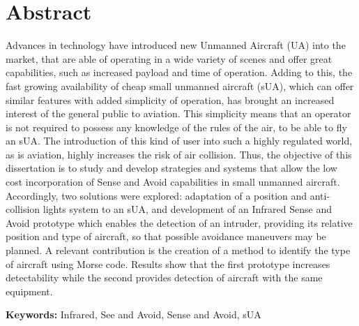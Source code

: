 
\section*{Abstract}


Advances in technology have introduced new Unmanned Aircraft (UA) into the market, that are able of operating in a wide variety of scenes and offer great capabilities, such as increased payload and time of operation. Adding to this, the fast growing availability of cheap small unmanned aircraft (sUA), which can offer similar features with added simplicity of operation, has brought an increased interest of the general public to aviation. This simplicity means that an operator is not required to possess any knowledge of the rules of the air, to be able to fly an sUA. The introduction of this kind of user into such a highly regulated world, as is aviation, highly increases the risk of air collision. Thus, the objective of this dissertation is to study and develop strategies and systems that allow the low cost incorporation of Sense and Avoid capabilities in small unmanned aircraft.  Accordingly, two solutions were explored: adaptation of a position and anti-collision lights system to an sUA, and development of an Infrared Sense and Avoid prototype which enables the detection of an intruder, providing its relative position and type of aircraft, so that possible avoidance maneuvers may be planned. A relevant contribution is the creation of a method to identify the type of aircraft using Morse code. Results show that the first prototype increases detectability while the second provides detection of aircraft with the same equipment.\\

\vfill

\textbf{\Large Keywords:} Infrared, See and Avoid, Sense and Avoid, sUA

\cleardoublepage

